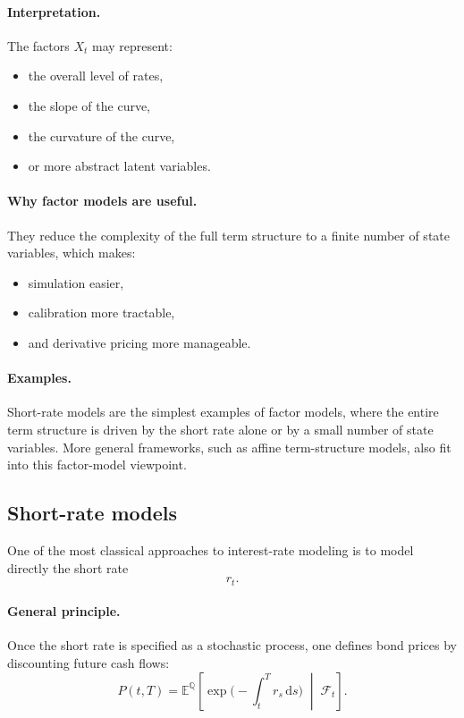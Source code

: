 \documentclass[11pt]{article}
\newcommand{\Qbb}{\mathbb{Q}}
\newcommand{\E}{\mathbb{E}}
\theoremstyle{plain}
\theoremstyle{definition}
\theoremstyle{remark}
\begin{document}
\paragraph{Interpretation.}
The factors \(X_t\) may represent:
\begin{itemize}[leftmargin=1.4em]
    \item the overall level of rates,
    \item the slope of the curve,
    \item the curvature of the curve,
    \item or more abstract latent variables.
\end{itemize}

\paragraph{Why factor models are useful.}
They reduce the complexity of the full term structure to a finite number
of state variables, which makes:
\begin{itemize}[leftmargin=1.4em]
    \item simulation easier,
    \item calibration more tractable,
    \item and derivative pricing more manageable.
\end{itemize}

\paragraph{Examples.}
Short-rate models are the simplest examples of factor models, where the
entire term structure is driven by the short rate alone or by a small
number of state variables.
More general frameworks, such as affine term-structure models, also fit
into this factor-model viewpoint.

\subsection{Short-rate models}

One of the most classical approaches to interest-rate modeling is to
model directly the short rate
\[
r_t.
\]

\paragraph{General principle.}
Once the short rate is specified as a stochastic process, one defines
bond prices by discounting future cash flows:
\[
P(t,T)
=
\E^\Qbb\!\left[
\exp\!\Big(-\int_t^T r_s\,\mathrm{d}s\Big)
\;\middle|\;
\mathcal{F}_t
\right].
\]
\end{document}
